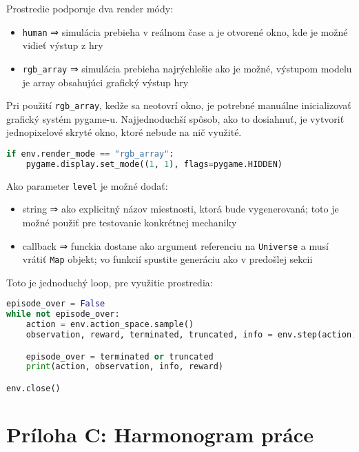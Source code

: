 Prostredie podporuje dva render módy:

\begin{itemize}
    \item \texttt{human} ⇒ simulácia prebieha v reálnom čase a je otvorené okno, kde je možné vidieť výstup z hry
    \item \texttt{rgb\_array} ⇒ simulácia prebieha najrýchlešie ako je možné, výstupom modelu je array obsahujúci grafický výstup hry
\end{itemize}

Pri použití \texttt{rgb\_array}, kedže sa neotovrí okno, je potrebné manuálne inicializovať grafický systém pygame-u. Najjednoduchší spôsob, ako to dosiahnuť, je vytvoriť jednopixelové skryté okno, ktoré nebude na nič využité.

\begin{lstlisting}[language=python]
if env.render_mode == "rgb_array":
    pygame.display.set_mode((1, 1), flags=pygame.HIDDEN)
\end{lstlisting}

Ako parameter \texttt{level} je možné dodať:

\begin{itemize}
    \item string ⇒ ako explicitný názov miestnosti, ktorá bude vygenerovaná; toto je možné použiť pre testovanie konkrétnej mechaniky
    \item callback ⇒ funckia dostane ako argument referenciu na \texttt{Universe} a musí vrátiť \texttt{Map} objekt; vo funkcií spustite generáciu ako v predošlej sekcii
\end{itemize}

Toto je jednoduchý loop, pre využitie prostredia:

\begin{lstlisting}[language=python]
episode_over = False
while not episode_over:
    action = env.action_space.sample()
    observation, reward, terminated, truncated, info = env.step(action)

    episode_over = terminated or truncated
    print(action, observation, info, reward)

env.close()
\end{lstlisting}


\newpage
\setcounter{page}{1}
\renewcommand{\thepage}{C.\arabic{page}}

\section*{Príloha C: Harmonogram práce}


